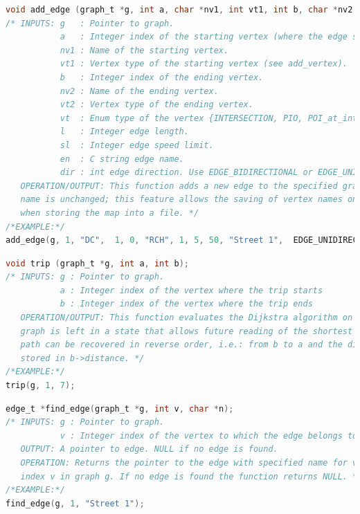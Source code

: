 \documentclass[10pt]{article}
\begin{document}
\begin{lstlisting}[language=C, caption= \textbf{API-2 add\_edge}]
void add_edge (graph_t *g, int a, char *nv1, int vt1, int b, char *nv2, int vt2, int l, int sl, char *en, int dir);
/* INPUTS: g   : Pointer to graph.
           a   : Integer index of the starting vertex (where the edge starts).
           nv1 : Name of the starting vertex.
           vt1 : Vertex type of the starting vertex (see add_vertex).
           b   : Integer index of the ending vertex.
           nv2 : Name of the ending vertex.
           vt2 : Vertex type of the ending vertex.
           vt  : Enum type of the vertex {INTERSECTION, PIO, POI_at_intersection}
           l   : Integer edge length.
           sl  : Integer edge speed limit.
           en  : C string edge name.
           dir : int edge direction. Use EDGE_BIDIRECTIONAL or EDGE_UNIDIRECTIONAL.
   OPERATION/OUTPUT: This function adds a new edge to the specified graph. Use it to populate the map. If a null string is specified for nv1 or nv2 the current
   name is unchanged; this feature allows the saving of vertex names only once
   when storing the map into a file. */
/*EXAMPLE:*/ 
add_edge(g, 1, "DC",  1, 0, "RCH", 1, 5, 50, "Street 1",  EDGE_UNIDIRECTIONAL);

\end{lstlisting}

\begin{lstlisting}[language=C, caption= \textbf{API-3 trip}]
void trip (graph_t *g, int a, int b);
/* INPUTS: g : Pointer to graph.
           a : Integer index of the vertex where the trip starts
           b : Integer index of the vertex where the trip ends
   OPERATION/OUTPUT: This function evaluates the Dijkstra algorithm on graph g. The
   graph is left in a state that allows future reading of the shortest path. The
   path can be recovered in reverse order, i.e.: from b to a and the distance is
   stored in b->distance. */
/*EXAMPLE:*/ 
trip(g, 1, 7);
\end{lstlisting}


\begin{lstlisting}[language=C, caption= \textbf{API-4 find\_edge}]
edge_t *find_edge(graph_t *g, int v, char *n);
/* INPUTS: g : Pointer to graph.
           v : Integer index of the vertex to which the edge belongs to.
   OUTPUT: A pointer to edge. NULL if no edge is found.
   OPERATION: Returns the pointer to the edge with specified name for vertex
   index v in graph g. If no edge is found the function returns NULL. */
/*EXAMPLE:*/ 
find_edge(g, 1, "Street 1");
\end{lstlisting}
\end{document}
